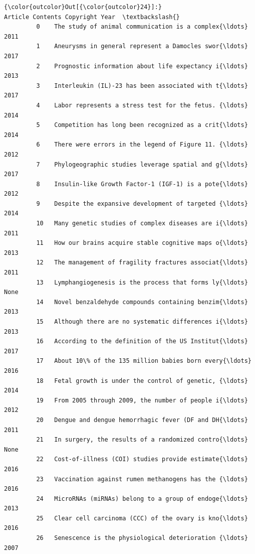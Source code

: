 \documentclass[11pt]{article}
\begin{document}
\begin{Verbatim}[commandchars=\\\{\}]
{\color{outcolor}Out[{\color{outcolor}24}]:}                                       Article Contents Copyright Year  \textbackslash{}
         0    The study of animal communication is a complex{\ldots}           2011   
         1    Aneurysms in general represent a Damocles swor{\ldots}           2017   
         2    Prognostic information about life expectancy i{\ldots}           2013   
         3    Interleukin (IL)-23 has been associated with t{\ldots}           2017   
         4    Labor represents a stress test for the fetus. {\ldots}           2014   
         5    Competition has long been recognized as a crit{\ldots}           2014   
         6    There were errors in the legend of Figure 11. {\ldots}           2012   
         7    Phylogeographic studies leverage spatial and g{\ldots}           2017   
         8    Insulin-like Growth Factor-1 (IGF-1) is a pote{\ldots}           2012   
         9    Despite the expansive development of targeted {\ldots}           2014   
         10   Many genetic studies of complex diseases are i{\ldots}           2011   
         11   How our brains acquire stable cognitive maps o{\ldots}           2013   
         12   The management of fragility fractures associat{\ldots}           2011   
         13   Lymphangiogenesis is the process that forms ly{\ldots}           None   
         14   Novel benzaldehyde compounds containing benzim{\ldots}           2013   
         15   Although there are no systematic differences i{\ldots}           2013   
         16   According to the definition of the US Institut{\ldots}           2017   
         17   About 10\% of the 135 million babies born every{\ldots}           2016   
         18   Fetal growth is under the control of genetic, {\ldots}           2014   
         19   From 2005 through 2009, the number of people i{\ldots}           2012   
         20   Dengue and dengue hemorrhagic fever (DF and DH{\ldots}           2011   
         21   In surgery, the results of a randomized contro{\ldots}           None   
         22   Cost-of-illness (COI) studies provide estimate{\ldots}           2016   
         23   Vaccination against rumen methanogens has the {\ldots}           2016   
         24   MicroRNAs (miRNAs) belong to a group of endoge{\ldots}           2013   
         25   Clear cell carcinoma (CCC) of the ovary is kno{\ldots}           2016   
         26   Senescence is the physiological deterioration {\ldots}           2007   

\end{Verbatim}
\end{document}
